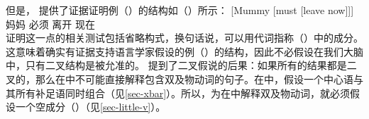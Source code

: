 \noindent
但是， \citet[]{Haegeman94a-u}提供了证据证明例（）的结构如（）所示：
\ea
\gll {}[Mummy [must [leave now]]]\\
     \spacebr{}妈妈 \spacebr{}必须 \spacebr{}离开 现在\\
\z
证明这一点的相关测试包括省略构式，换句话说，可以用代词指称（）中的成分。这意味着确实有证据支持语言学家假设的例（）的结构，因此不必假设在我们大脑中，只有二叉结构是被允准的。 \citet[]{Haegeman94a-u}提到了二叉假说的后果：如果所有的结果都是二叉的，那么在\xbartc 中不可能直接解释包含双及物动词的句子。在\xbartc 中，假设一个中心语与其所有补足语同时组合（见\ref{sec-xbar}）。所以，为在\xbartc 中解释双及物动词，就必须假设一个空成分（\littlevc）（见\ref{sec-little-v}）。

